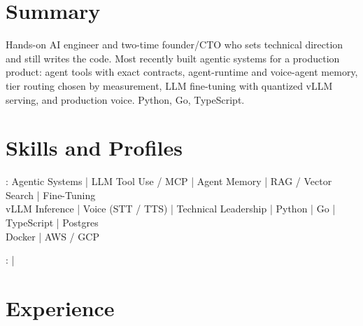 \documentclass[print]{jack-resume}
\begin{document}
\pagecolor{darkmodeBackground}


\begin{minipage}[t][1cm][t]{.03\textwidth}
    \hfill
\end{minipage}

\section{Summary}
Hands-on AI engineer and two-time founder/CTO who sets technical direction and still writes the code. Most recently built agentic systems for a production product: agent tools with exact contracts, agent-runtime and voice-agent memory, tier routing chosen by measurement, LLM fine-tuning with quantized vLLM serving, and production voice. Python, Go, TypeScript.
\sectionsep

\section{Skills and Profiles}
:
Agentic Systems \hfill | \hfill
LLM Tool Use / MCP \hfill | \hfill
Agent Memory \hfill | \hfill
RAG / Vector Search \hfill | \hfill
Fine-Tuning \\
\hspace{1.0cm} vLLM Inference \hfill | \hfill
Voice (STT / TTS) \hfill | \hfill
Technical Leadership \hfill | \hfill
Python \hfill | \hfill
Go \hfill | \hfill
TypeScript \hfill | \hfill
Postgres \\
\hspace{1.0cm} Docker \hfill | \hfill
AWS / GCP \\

\raggedright{
    :
      \href{https://www.linkedin.com/in/jack-sturtevant/}{ \ExternalLink} |
     \href{https://github.com/jacksturt}{ \ExternalLink}}

\section{Experience}
\end{document}
